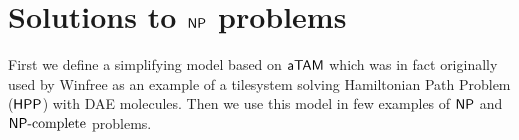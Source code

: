\chapter{Solutions to $\mathsf{NP}$ problems}
\label{chap:problems}



First we define a simplifying model based on $\mathsf{aTAM}$ which was in fact originally used by Winfree \cite{winfree_phd} as an example of a tilesystem solving Hamiltonian Path Problem ($\sf HPP$) with DAE molecules. Then we use this model in few examples of $\mathsf{NP}$ and $\mathsf{NP}\textnormal{-complete}$ problems.









